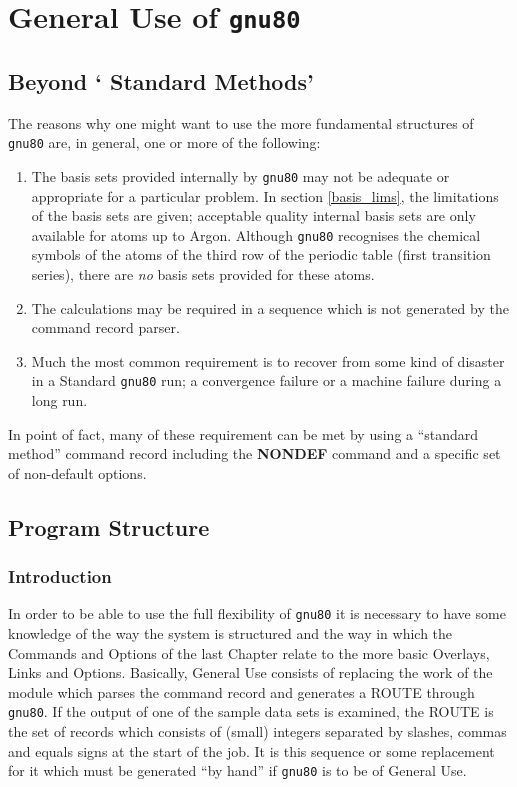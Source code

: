 \chapter{\sf General Use of {\tt gnu80}}
\label{chap3}
\section{\sf Beyond ` Standard Methods'}
The reasons why one might want to use the more fundamental
structures of {\tt gnu80} are, in general, one or more of the following:
\begin{enumerate}
\item The basis sets provided internally by {\tt gnu80} may not
be adequate or appropriate for a particular problem. In section
\ref{basis_lims}, the limitations of the basis sets are given; acceptable
quality internal basis sets are only available for atoms
up to Argon. Although {\tt gnu80} recognises the chemical symbols
of the atoms of the third row of the periodic table (first transition
series), there are {\em no} basis sets provided for these atoms.
\item The calculations may be required in a sequence
which is not generated by the command record parser.
\item
Much the most common requirement is to recover from some
kind of disaster in a Standard {\tt gnu80} run; a convergence
failure or a machine failure during a long run.
\end{enumerate}
In point of fact, many of these requirement can be met by using
a ``standard method'' command record including
the {\bf NONDEF} command and a specific set of non-default options.
\section{\sf Program Structure}
\subsection{\sf Introduction}
In order to be able to use the full flexibility of {\tt gnu80}
it is necessary to have some knowledge of the way the system
is structured and the way in which the Commands and Options
of the last Chapter relate to the more basic Overlays, Links
and Options. Basically, General Use consists of replacing the
work of the module  which parses the command record and generates
a ROUTE through {\tt gnu80}. If the output of one of the
sample data sets is examined, the ROUTE is the set of records
which consists of (small) integers separated by slashes, commas
and equals signs at the start of the job. It is this sequence
or some replacement for it which must be generated ``by hand''
if {\tt gnu80} is to be of General Use.


